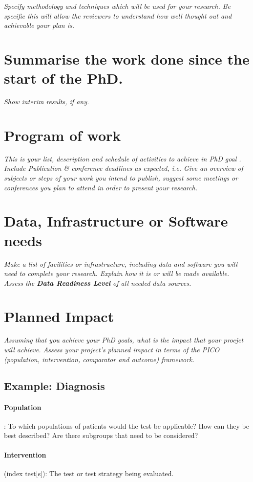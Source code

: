 \documentclass[a4paper]{article}
\begin{document}
\emph{Specify methodology and techniques which will be used for your research. Be specific this will allow the reviewers to understand how well thought out and achievable your plan is.}
\section{Summarise the work done since the start of the PhD.}
\emph{Show interim results, if any.}
\section{Program of work}
\emph{This is your list, description and schedule of activities to achieve in PhD goal . Include Publication \& conference deadlines as expected, i.e. Give an overview of subjects or steps of your work you intend to publish,  suggest some meetings or conferences you plan to attend in order to present your research.}

\section{Data, Infrastructure or Software needs}
\emph{Make a list of facilities or infrastructure, including data and software you will need to complete your research. Explain how it is or will be made available. Assess the \textbf{Data Readiness Level} of all needed data sources.}

\section{Planned Impact}
\emph{Assuming that you achieve your PhD goals, what is the impact that your proejct will achieve. Assess your project's planned impact in terms of the PICO (population, intervention, comparator and outcome) framework.}

\subsection*{Example: Diagnosis}
\paragraph{Population}: To which populations of patients would the test be applicable? How can they be best described? Are there subgroups that need to be considered?

\paragraph{Intervention} (index test[s]): The test or test strategy being evaluated.
\end{document}
